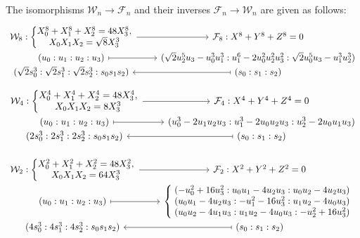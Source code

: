 \documentclass{amsart}
\newcommand{\cF}{\mathcal{F}}
\newcommand{\cW}{\mathcal{W}}
\begin{document}
The isomorphisms $\cW_n \longrightarrow \cF_n$ and their inverses $\cF_n \longrightarrow \cW_n$
are given as follows:
$$
\begin{tikzcd}[row sep=-2mm,column sep=8mm]
  \cW_8: \left\{
  \begin{array}{@{}c@{}}
    X_0^8 + X_1^8 + X_2^8 = 48 X_3^8,\\
    X_0 X_1 X_2 = \sqrt{8} X_3^3
  \end{array} \right. \arrow[r] & \cF_8 : X^8 + Y^8 + Z^8 = 0\\[1mm]
  (u_0:u_1:u_2:u_3) \arrow[r,mapsto] &
  (\sqrt{2} u_2^5 u_3 - u_0^3 u_1^3 : u_1^6 - 2 u_0^2 u_2^2 u_3^2 : \sqrt{2} u_0^5 u_3 - u_1^3 u_2^3)\\[1mm]
  (\sqrt{2}s_0^3:\sqrt{2}s_1^3:\sqrt{2}s_2^3:s_0s_1s_2) & \arrow[l,mapsto] (s_0:s_1:s_2)
\end{tikzcd}
$$
$$
\begin{tikzcd}[row sep=-2mm,column sep=8mm]
  \cW_4: \left\{
  \begin{array}{@{}c@{}}
    X_0^4 + X_1^4 + X_2^4 = 48 X_3^4,\\
    X_0 X_1 X_2 = 8 X_3^3
  \end{array} \right. \arrow[r] & \cF_4 : X^4 + Y^4 + Z^4 = 0\\[1mm]
  (u_0:u_1:u_2:u_3) \arrow[r,mapsto] & (u_0^3 - 2u_1 u_2 u_3 : u_1^3 - 2u_0 u_2 u_3 : u_2^3 - 2u_0 u_1 u_3)\\[1mm]
  (2s_0^3:2s_1^3:2s_2^3:s_0s_1s_2) & \arrow[l,mapsto] (s_0:s_1:s_2)
\end{tikzcd}
$$

$$
\begin{tikzcd}[row sep=-2mm,column sep=8mm]
  \cW_2: \left\{
  \begin{array}{@{}c@{}}
    X_0^2 + X_1^2 + X_2^2 = 48 X_3^2,\\
    X_0 X_1 X_2 = 64 X_3^3
  \end{array} \right. \arrow[r] & \cF_2 : X^2 + Y^2 + Z^2 = 0\\[1mm]
  (u_0:u_1:u_2:u_3) \arrow[r,mapsto] &
  \left\{\begin{array}{@{\;}l}
  (-u_0^2 + 16 u_3^2: u_0 u_1 - 4 u_2 u_3: u_0 u_2 - 4 u_2 u_3)\\
  (u_0 u_1 - 4 u_2 u_3: -u_1^2 - 16 u_3^2: u_1 u_2 - 4 u_0 u_3)\\
  (u_0 u_2 - 4 u_1 u_3: u_1 u_2 - 4 u_0 u_3: -u_2^2 + 16 u_3^2)
  \end{array}\right.\\[1mm]
  (4s_0^3:4s_1^3:4s_2^3:s_0s_1s_2) & \arrow[l,mapsto] (s_0:s_1:s_2)
\end{tikzcd}
$$
\end{document}
